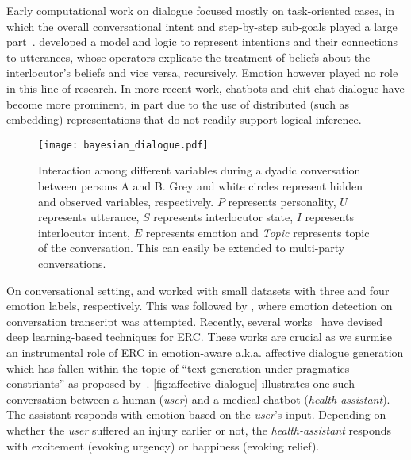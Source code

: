 \documentclass{IEEEtran}\usepackage[pdftex]{graphicx}
\begin{document}
	Early computational work on dialogue focused mostly on task-oriented cases, in which the overall conversational intent and step-by-step sub-goals played a large part~\citep{grosz1986attention,appelt1992planning}. \citet{cohen1985speech} developed a model and logic to represent intentions and their connections to utterances, whose operators explicate the treatment of beliefs about the interlocutor’s beliefs and vice versa, recursively.  Emotion however played no role in this line of research.  In more recent work, chatbots and chit-chat dialogue have become more prominent, in part due to the use of distributed (such as embedding) representations that do not readily support logical inference.
	
	\begin{figure}
		\centering
		\texttt{[image: bayesian\_dialogue.pdf]}
		\caption{Interaction among different variables during a dyadic conversation between persons A and B. Grey and white circles represent hidden and observed variables, respectively. $P$ represents personality, $U$ represents utterance, $S$ represents interlocutor state, $I$ represents interlocutor intent, $E$ represents emotion and \emph{Topic} represents topic of the conversation. This can easily be extended to multi-party conversations.}
		\label{fig:intent-modelling}
	\end{figure}
	
	On conversational setting, \citet{dmello} and \citet{yang} worked with small datasets with three and four emotion labels, respectively. This was followed by \citet{Y16-2006}, where emotion detection on conversation transcript was attempted. Recently, several
	works~\citep{hazarika2018icon,bae2019snu_ids} have devised deep learning-based techniques for ERC.
	These works are crucial as we surmise an instrumental role
	of ERC in emotion-aware a.k.a. affective dialogue generation which has fallen within the topic of ``text generation under pragmatics constriants'' as proposed by~\citet{hovy1987generating}. \cref{fig:affective-dialogue} illustrates
	one such conversation between a human ({\it user}) and a medical chatbot ({\it health-assistant}). The assistant responds with emotion based
	on the {\it user}'s input. Depending on whether the {\it user} suffered an injury earlier or not, the
	{\it health-assistant} responds with excitement (evoking urgency) or happiness (evoking relief).
	
\end{document}
